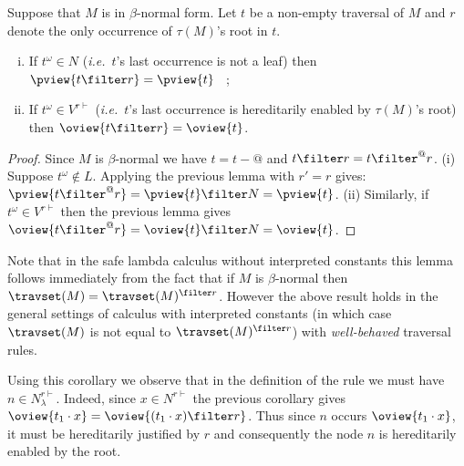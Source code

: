 
\begin{corollary}
\label{cor:redtrav_trav} Suppose that  $M$ is in $\beta$-normal
form. Let $t$ be a non-empty traversal of $M$ and $r$ denote the
only occurrence of $\tau(M)$'s root in $t$.
\begin{enumerate}[(i)]
\item If $t^\omega \in N$ ({\it i.e.}~$t$'s last occurrence is not a leaf) then $ \pview{t \filter  r } = \pview{t}$ \ ;
\item If $t^\omega \in V^{r\vdash}$ ({\it i.e.}~$t$'s last occurrence is
hereditarily enabled by $\tau(M)$'s root) then
 $\oview{t \filter r } = \oview{t}$.
\end{enumerate}
\end{corollary}
\begin{proof}
Since $M$ is $\beta$-normal we have $t= t-@$ and $t\filter r = t
\filter^@ r$. (i) Suppose $t^\omega \not\in L$. Applying the
previous lemma with $r'=r$ gives: $\pview{t\filter^@ r} =
\pview{t}\filter N = \pview{t}$. (ii) Similarly, if $t^\omega \in
V^{r\vdash}$ then the previous lemma gives $\oview{t\filter^@ r} =
\oview{t} \filter N = \oview{t}$.
\end{proof}
Note that in the safe lambda calculus without interpreted constants
this lemma follows immediately from the fact that if $M$ is
$\beta$-normal then $\travset(M) = \travset(M)^{\filter r }$.
However the above result holds in the general settings of calculus
with interpreted constants (in which case $\travset(M)$ is not equal
to $\travset(M)^{\filter r }$) with \emph{well-behaved} traversal
rules.

\begin{remark}
\label{rem:inputvar} Using this corollary we observe that in the
definition of the rule  we must have $n \in
N_\lambda^{r\vdash}$. Indeed, since $x\in N^{r\vdash}$ the previous
corollary gives $\oview{t_1 \cdot x } = \oview{ (t_1 \cdot x)
\filter r}$. Thus since $n$ occurs $\oview{t_1 \cdot x }$, it must
be hereditarily justified by $r$ and consequently the node $n$ is
hereditarily enabled by the root.
\end{remark}

